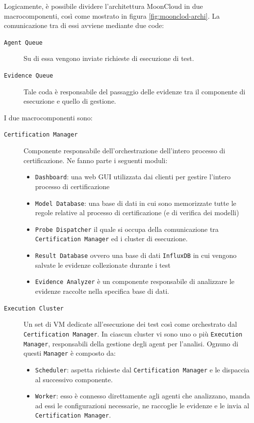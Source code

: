 Logicamente, è possibile dividere l'architettura MoonCloud
in due macrocomponenti, così come mostrato in figura \ref{fig:moonclod-archi}.
La comunicazione tra di essi avviene mediante due code:
\begin{description}
	\item[\texttt{Agent Queue}]Su di essa vengono inviate richieste di esecuzione di test.
	\item[\texttt{Evidence Queue}]Tale coda è responsabile del passaggio delle evidenze tra
	il componente di esecuzione e quello di gestione. 
\end{description}
I due macrocomponenti sono:
\begin{description}
	\item[\texttt{Certification Manager}]Componente responsabile dell'orchestrazione
	dell'intero processo di certificazione. Ne fanno parte i seguenti moduli:
	\begin{itemize}
		\item \texttt{Dashboard}: una web GUI utilizzata dai clienti per
		      gestire l'intero processo di certificazione
		\item \texttt{Model Database}: una base di dati in cui sono memorizzate
		      tutte le regole relative al processo di certificazione (e di verifica
		      dei modelli)
		\item \texttt{Probe Dispatcher} il quale si occupa della comunicazione
		      tra \texttt{Certification Manager} ed i cluster di esecuzione.
		\item \texttt{Result Database} ovvero una base di dati \texttt{InfluxDB} in
		      cui vengono salvate le evidenze collezionate durante i test
		\item \texttt{Evidence Analyzer} è un componente responsabile di analizzare
		      le evidenze raccolte nella specifica base di dati. %
	\end{itemize}
	\item[\texttt{Execution Cluster}]Un set di VM dedicate all'esecuzione dei
	test così come orchestrato dal \texttt{Certification Manager}. In ciascun
	cluster vi sono uno o più \texttt{Execution Manager}, responsabili
	della gestione degli agent per l'analisi. Ognuno di questi \texttt{Manager}
	è composto da:
	\begin{itemize}
		\item \texttt{Scheduler}: aspetta richieste dal \texttt{Certification Manager}
		      e le dispaccia al successivo componente.    
		\item \texttt{Worker}: esso è connesso direttamente agli agenti che analizzano,
		      manda ad essi le configurazioni necessarie, ne raccoglie le evidenze e le invia
		      al \texttt{Certification Manager}.
	\end{itemize}
\end{description}

